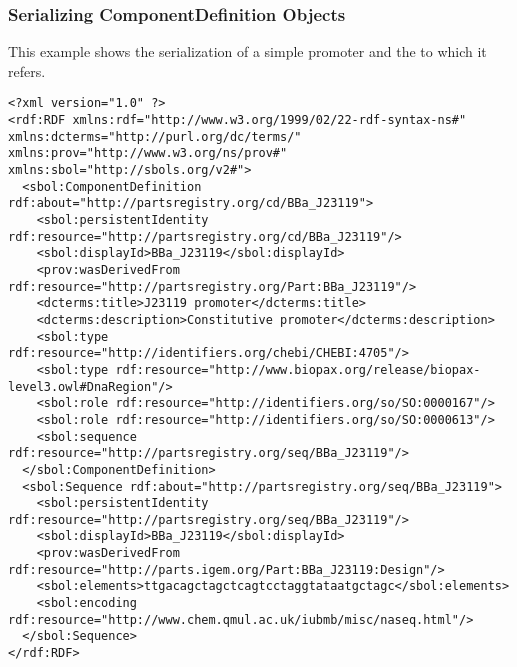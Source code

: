 \subsubsection{Serializing ComponentDefinition Objects}
This example shows the serialization of a simple promoter  and the  to which it refers.
\begin{lstlisting}
<?xml version="1.0" ?>
<rdf:RDF xmlns:rdf="http://www.w3.org/1999/02/22-rdf-syntax-ns#" xmlns:dcterms="http://purl.org/dc/terms/" xmlns:prov="http://www.w3.org/ns/prov#" xmlns:sbol="http://sbols.org/v2#">
  <sbol:ComponentDefinition rdf:about="http://partsregistry.org/cd/BBa_J23119">
    <sbol:persistentIdentity rdf:resource="http://partsregistry.org/cd/BBa_J23119"/>
    <sbol:displayId>BBa_J23119</sbol:displayId>
    <prov:wasDerivedFrom rdf:resource="http://partsregistry.org/Part:BBa_J23119"/>
    <dcterms:title>J23119 promoter</dcterms:title>
    <dcterms:description>Constitutive promoter</dcterms:description>
    <sbol:type rdf:resource="http://identifiers.org/chebi/CHEBI:4705"/>
    <sbol:type rdf:resource="http://www.biopax.org/release/biopax-level3.owl#DnaRegion"/>
    <sbol:role rdf:resource="http://identifiers.org/so/SO:0000167"/>
    <sbol:role rdf:resource="http://identifiers.org/so/SO:0000613"/>
    <sbol:sequence rdf:resource="http://partsregistry.org/seq/BBa_J23119"/>
  </sbol:ComponentDefinition>
  <sbol:Sequence rdf:about="http://partsregistry.org/seq/BBa_J23119">
    <sbol:persistentIdentity rdf:resource="http://partsregistry.org/seq/BBa_J23119"/>
    <sbol:displayId>BBa_J23119</sbol:displayId>
    <prov:wasDerivedFrom rdf:resource="http://parts.igem.org/Part:BBa_J23119:Design"/>
    <sbol:elements>ttgacagctagctcagtcctaggtataatgctagc</sbol:elements>
    <sbol:encoding rdf:resource="http://www.chem.qmul.ac.uk/iubmb/misc/naseq.html"/>
  </sbol:Sequence>
</rdf:RDF>
\end{lstlisting}

